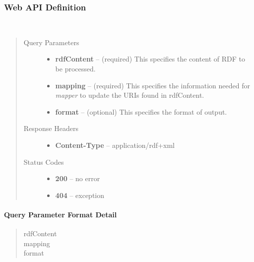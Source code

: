 \documentclass[letterpaper,10pt,english]{sphinxmanual}
\begin{document}
\subsubsection{Web API Definition}
\label{docs/mapper:web-api-definition}

\begin{fulllineitems}
\label{docs/mapper:post--mapper_?rdfContent, mapping, format_}~\begin{quote}\begin{description}
\item[{Query Parameters}] \leavevmode\begin{itemize}
\item {} 
\textbf{rdfContent} -- (required) This specifies the content of RDF to be processed.

\item {} 
\textbf{mapping} -- (required) This specifies the information needed for \emph{mapper} to update the URIs found in rdfContent.

\item {} 
\textbf{format} -- (optional) This specifies the format of output.

\end{itemize}

\item[{Response Headers}] \leavevmode\begin{itemize}
\item {} 
\textbf{Content-Type} -- application/rdf+xml

\end{itemize}

\item[{Status Codes}] \leavevmode\begin{itemize}
\item {} 
\textbf{200} -- no error

\item {} 
\textbf{404} -- exception

\end{itemize}

\end{description}\end{quote}

\end{fulllineitems}



\paragraph{Query Parameter Format Detail}
\label{docs/mapper:query-parameter-format-detail}\begin{quote}\begin{description}
\item[{rdfContent}] \leavevmode
\item[{mapping}] \leavevmode
\item[{format}] \leavevmode
\end{description}\end{quote}
\end{document}
